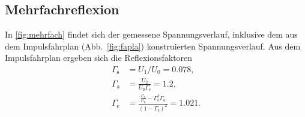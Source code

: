 \subsection{Mehrfachreflexion}
In \autoref{fig:mehrfach} findet sich der gemessene Spannungsverlauf, inklusive dem aus dem Impulsfahrplan (Abb.~\ref{fig:fapla}) konstruierten Spannungsverlauf. Aus dem Impulsfahrplan ergeben sich die Reflexionsfaktoren
\begin{align}
  \Gamma_\mathrm s &= U_1 / U_0 =\num{0.078}, \\
  \Gamma_\mathrm a &= \frac{U_2}{U_ß \Gamma_\mathrm s} =\num{1.2}, \\
  \Gamma_\mathrm e &= \frac{\frac{U_3}{U_0} - \Gamma_\mathrm s ^2 \Gamma_\mathrm a}{(1-\Gamma_\mathrm s)^2} = \num{1.021}.
\end{align}
